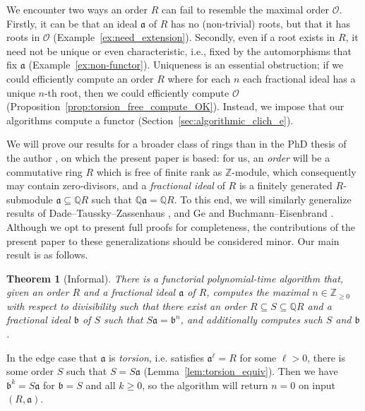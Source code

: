 \documentclass{amsart}
\theoremstyle{plain}
\newtheorem{theorem}{Theorem}[section]
\theoremstyle{definition}
\newcommand{\Z}{\ensuremath{\mathbb{Z}}}
\newcommand{\Q}{\ensuremath{\mathbb{Q}}}
\begin{document}
We encounter two ways an order \(R\) can fail to resemble the maximal order \(\mathcal{O}\).
Firstly, it can be that an ideal \(\mathfrak{a}\) of \(R\) has no (non-trivial) roots, but that it has roots in \(\mathcal{O}\) (Example~\ref{ex:need_extension}).
Secondly, even if a root exists in \(R\), it need not be unique or even characteristic, i.e., fixed by the automorphisms that fix \(\mathfrak{a}\) (Example~\ref{ex:non-functor}).
Uniqueness is an essential obstruction; if we could efficiently compute an order \(R\) where for each \(n\) each fractional ideal has a unique \(n\)-th root, then we could efficiently compute \(\mathcal{O}\) (Proposition~\ref{prop:torsion_free_compute_OK}).
Instead, we impose that our algorithms compute a functor (Section~\ref{sec:algorithmic_clich_e}).


We will prove our results for a broader class of rings than in the PhD thesis of the author \cite{thesis}, on which the present paper is based: for us, an \emph{order} will be a commutative ring $R$ which is free of finite rank as \(\Z\)-module, which consequently may contain zero-divisors, and a \emph{fractional ideal} of \(R\) is a finitely generated \(R\)-submodule \(\mathfrak{a}\subseteq \Q R\) such that \(\Q \mathfrak{a}=\Q R\).
To this end, we will similarly generalize results of Dade--Taussky--Zassenhaus \cite{Dade-Zassenhaus}, and Ge and Buchmann--Eisenbrand \cite{Ge,Buchmann-Eisenbrand}.
Although we opt to present full proofs for completeness, the contributions of the present paper to these generalizations should be considered minor.
Our main result is as follows.

\begin{theorem}[Informal]\label{thm:informal}
There is a functorial polynomial-time algorithm that, given an order $R$ and a fractional ideal $\mathfrak{a}$ of $R$, computes the maximal $n\in\Z_{\geq 0}$ with respect to divisibility such that there exist an order $R\subseteq S\subseteq \Q R$ and a fractional ideal $\mathfrak{b}$ of $S$ such that $S\mathfrak{a}=\mathfrak{b}^n$, and additionally computes such $S$ and $\mathfrak{b}$. 
\end{theorem}

In the edge case that \(\mathfrak{a}\) is \emph{torsion}, i.e. satisfies $\mathfrak{a}^\ell=R$ for some $\ell>0$, there is some order \(S\) such that \(S=S\mathfrak{a}\) (Lemma~\ref{lem:torsion_equiv}).
Then we have \(\mathfrak{b}^k=S\mathfrak{a}\) for \(\mathfrak{b}=S\) and all \(k\geq 0\), so the algorithm will return \(n=0\) on input $(R,\mathfrak{a})$.
\end{document}
